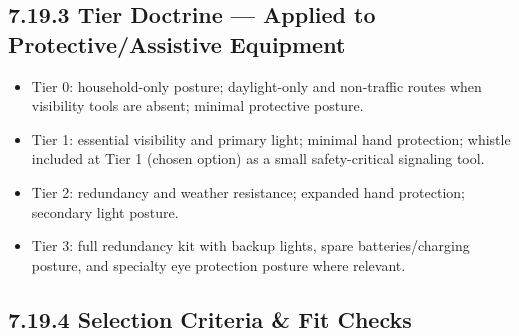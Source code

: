 \documentclass[10pt]{article}
\begin{document}
\subsection*{7.19.3 Tier Doctrine — Applied to Protective/Assistive Equipment}
{}

\begin{itemize}
\item Tier 0: household-only posture; daylight-only and non-traffic routes when visibility tools are absent; minimal protective posture.
\item Tier 1: essential visibility and primary light; minimal hand protection; whistle included at Tier 1 (chosen option) as a small safety-critical signaling tool.
\item Tier 2: redundancy and weather resistance; expanded hand protection; secondary light posture.
\item Tier 3: full redundancy kit with backup lights, spare batteries/charging posture, and specialty eye protection posture where relevant.
\end{itemize}

\subsection*{7.19.4 Selection Criteria \& Fit Checks}
{}
\end{document}
